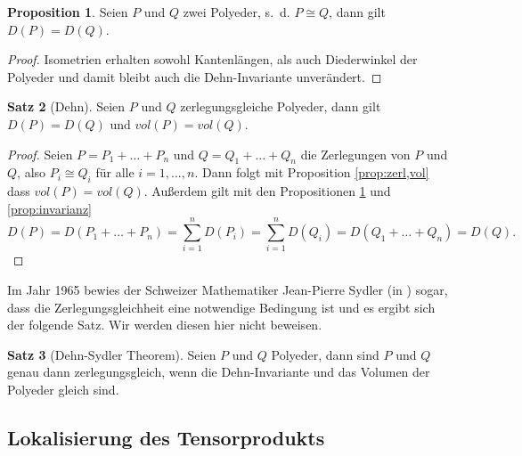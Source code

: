 \documentclass[11pt,titlepage]{article}
\theoremstyle{definition}
\newtheorem{theorem}{Satz}[section]
\newtheorem{proposition}[theorem]{Proposition}
\theoremstyle{remark}
\begin{document}
	\begin{proposition} \label{prop:cong,dehn}
		Seien $P$ und $Q$ zwei Polyeder, s.~d. $P\cong Q$, dann gilt $D(P)=D(Q)$.
	\end{proposition}
	
	\begin{proof}
		Isometrien erhalten sowohl Kantenlängen, als auch Diederwinkel der Polyeder und damit bleibt auch 
		die Dehn-Invariante unverändert.
	\end{proof}
	
	\begin{theorem}[Dehn] \label{thm:dehn}
		Seien $P$ und $Q$ zerlegungsgleiche Polyeder, dann gilt $D(P)=D(Q)$ und $vol(P)=vol(Q)$.
	\end{theorem}
	
	\begin{proof}
		Seien $P=P_1+\ldots+P_n$ und $Q=Q_1+\ldots+Q_n$ die Zerlegungen von $P$ und 
		$Q$, also $P_i\cong Q_i$ für alle $i=1,\ldots,n$. Dann folgt mit Proposition \ref{prop:zerl,vol}
		dass $vol(P)=vol(Q)$. Außerdem gilt mit den Propositionen \ref{prop:cong,dehn}
		und \ref{prop:invarianz}
		\[D(P)=D(P_1+\ldots+P_n)=\sum_{i=1}^n D(P_i) =\sum_{i=1}^n D(Q_i)=D(Q_1+\ldots+Q_n)=D(Q).\]
	\end{proof}
	
	Im Jahr 1965 bewies der Schweizer Mathematiker Jean-Pierre Sydler (in 
	\cite{Sydler1965}) 
	sogar, dass die Zerlegungsgleichheit eine notwendige Bedingung ist und 
	es ergibt sich der folgende Satz. Wir werden diesen hier nicht beweisen.
	
	\begin{theorem}[Dehn-Sydler Theorem]
		Seien $P$ und $Q$ Polyeder, dann sind $P$ und $Q$ genau 
		dann zerlegungsgleich, wenn die Dehn-Invariante und das Volumen 
		der Polyeder gleich sind.
	\end{theorem}
	
	\subsection{Lokalisierung des Tensorprodukts}
	
\end{document}
